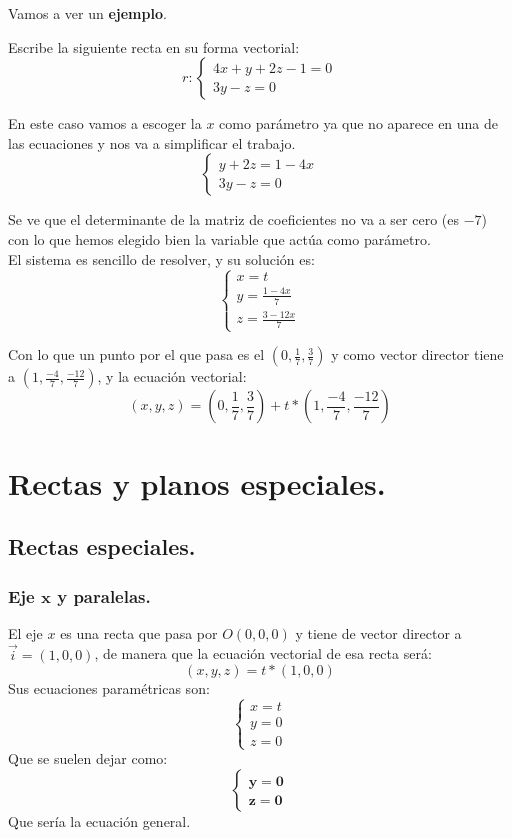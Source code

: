 \documentclass[a4paper,11pt,answers]{exam}
\begin{document}
Vamos a ver un \textbf{ejemplo}.
\begin{questions}
	\question Escribe la siguiente recta en su forma vectorial:
	\[r: \left\lbrace\begin{array}{l}
		4x + y + 2z -1 = 0\\
		3y - z = 0
	\end{array}\right.\]
\begin{solution}
	En este caso vamos a escoger la $x$ como parámetro ya que no aparece en una de las ecuaciones y nos va a simplificar el trabajo.
	\[\left\lbrace\begin{array}{l}
		y + 2z= 1-4x\\
		3y - z = 0
	\end{array}\right.\]

	Se ve que el determinante de la matriz de coeficientes no va a ser cero (es $-7$) con lo que hemos elegido bien la variable que actúa como parámetro.\\
	El sistema es sencillo de resolver, y su solución es:
	\[\left\lbrace\begin{array}{l}
		x=t\\
		y=\frac{1-4x}{7}\\
		z=\frac{3-12x}{7}
	\end{array}\right.
	\]

	Con lo que un punto por el que pasa es el $\left(0, \frac{1}{7}, \frac{3}{7}\right)$ y como vector director tiene a $\left(1,\frac{-4}{7}, \frac{-12}{7}\right)$, y la ecuación vectorial:
	\[(x,y,z) = \left(0, \frac{1}{7}, \frac{3}{7}\right) + t*\left(1,\frac{-4}{7}, \frac{-12}{7}\right)\]
\end{solution}
\end{questions}
\section{Rectas y planos especiales.}
\subsection{Rectas especiales.}
\subsubsection{Eje $\boldsymbol{x}$ y paralelas.}
El eje $x$ es una recta que pasa por $O(0,0,0)$ y tiene de vector director a $\vec i =(1,0,0)$, de manera que la ecuación vectorial de esa recta será:
\[(x,y,z) = t*(1,0,0)\]
Sus ecuaciones paramétricas son:
\[\left\lbrace\begin{array}{l}
x=t\\
y=0\\
z=0
\end{array}\right.\]
Que se suelen dejar como:
\[\boldsymbol{\left\lbrace\begin{array}{l}
y=0\\
z=0
\end{array}\right.}\]
Que sería la ecuación general.
\end{document}
